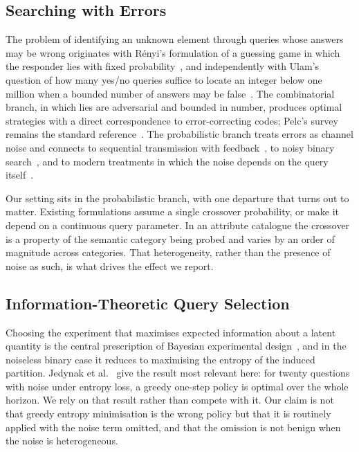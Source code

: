 \documentclass[conference]{IEEEtran}
\begin{document}
\subsection{Searching with Errors}

The problem of identifying an unknown element through queries whose answers may
be wrong originates with R\'enyi's formulation of a guessing game in which the
responder lies with fixed probability~\cite{renyi1961}, and independently with
Ulam's question of how many yes/no queries suffice to locate an integer below
one million when a bounded number of answers may be false~\cite{ulam1976}. The
combinatorial branch, in which lies are adversarial and bounded in number,
produces optimal strategies with a direct correspondence to error-correcting
codes; Pelc's survey remains the standard reference~\cite{pelc2002}. The
probabilistic branch treats errors as channel noise and connects to sequential
transmission with feedback~\cite{horstein1963,burnashev1974}, to noisy binary
search~\cite{karp2007,nowak2011}, and to modern treatments in which the noise
depends on the query itself~\cite{kaspi2018,chung2018}.

Our setting sits in the probabilistic branch, with one departure that turns out
to matter. Existing formulations assume a single crossover probability, or make
it depend on a continuous query parameter. In an attribute catalogue the
crossover is a property of the semantic category being probed and varies by an
order of magnitude across categories. That heterogeneity, rather than the
presence of noise as such, is what drives the effect we report.

\subsection{Information-Theoretic Query Selection}

Choosing the experiment that maximises expected information about a latent
quantity is the central prescription of Bayesian experimental
design~\cite{lindley1956,chaloner1995}, and in the noiseless binary case it
reduces to maximising the entropy of the induced partition. Jedynak et
al.~\cite{jedynak2012} give the result most relevant here: for twenty questions
with noise under entropy loss, a greedy one-step policy is optimal over the
whole horizon. We rely on that result rather than compete with it. Our claim is
not that greedy entropy minimisation is the wrong policy but that it is
routinely applied with the noise term omitted, and that the omission is not
benign when the noise is heterogeneous.
\end{document}
